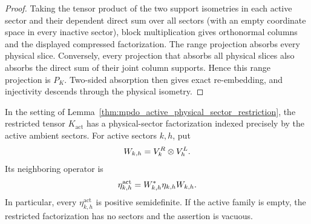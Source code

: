 \begin{proof}
    \leanok
    Taking the tensor product of the two support isometries in each active
    sector and their dependent direct sum over all sectors (with an empty
    coordinate space in every inactive sector), block multiplication gives
    orthonormal columns and the displayed compressed factorization.  The
    range projection absorbs every physical slice.  Conversely, every
    projection that absorbs all physical slices also absorbs the direct sum
    of their joint column supports.  Hence this range projection is $P_K$.
    Two-sided absorption then gives exact re-embedding, and injectivity
    descends through the physical isometry.
\end{proof}

\begin{lemma}
    \label{thm:mpdo_active_physical_sector_neighboring_positivity}
    \leanok
    In the setting of
    Lemma~\ref{thm:mpdo_active_physical_sector_restriction}, the restricted
    tensor $K_{\mathrm{act}}$ has a physical-sector factorization indexed
    precisely by the active ambient sectors.  For active sectors $k,h$, put
    \begin{align}
        W_{k,h}=V_k^R\otimes V_h^L.
        \notag
    \end{align}
    Its neighboring operator is
    \begin{align}
        \eta^{\mathrm{act}}_{k,h}
        =W_{k,h}^*\eta_{k,h}W_{k,h}.
        \notag
    \end{align}
    In particular, every $\eta^{\mathrm{act}}_{k,h}$ is positive
    semidefinite.  If the active family is empty, the restricted
    factorization has no sectors and the assertion is vacuous.


\end{lemma}
